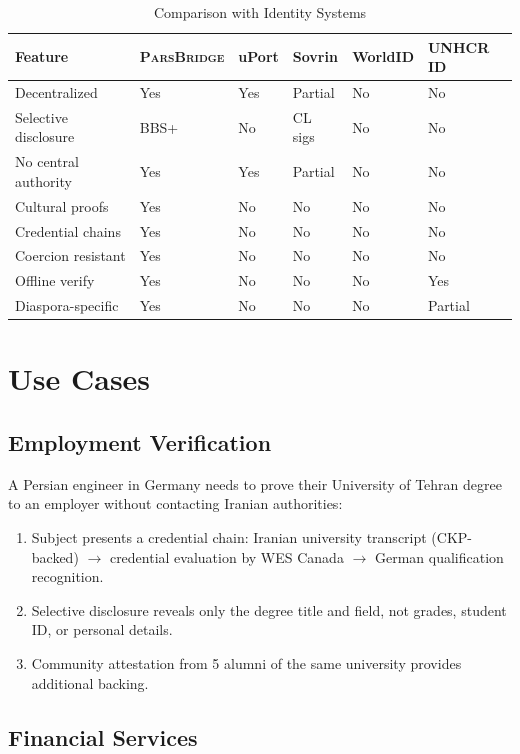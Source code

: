 \documentclass[11pt,a4paper]{article}
\newcommand{\bridge}{\textsc{ParsBridge}\xspace}
\begin{document}
\begin{table}[H]
\centering
\caption{Comparison with Identity Systems}
\label{tab:compare}
\begin{tabularx}{\textwidth}{lXXXXX}
\toprule
\textbf{Feature} & \textbf{\bridge} & \textbf{uPort} & \textbf{Sovrin} & \textbf{WorldID} & \textbf{UNHCR ID} \\
\midrule
Decentralized & Yes & Yes & Partial & No & No \\
Selective disclosure & BBS+ & No & CL sigs & No & No \\
No central authority & Yes & Yes & Partial & No & No \\
Cultural proofs & Yes & No & No & No & No \\
Credential chains & Yes & No & No & No & No \\
Coercion resistant & Yes & No & No & No & No \\
Offline verify & Yes & No & No & No & Yes \\
Diaspora-specific & Yes & No & No & No & Partial \\
\bottomrule
\end{tabularx}
\end{table}

\section{Use Cases}

\subsection{Employment Verification}

A Persian engineer in Germany needs to prove their University of Tehran degree to an employer without contacting Iranian authorities:

\begin{enumerate}
    \item Subject presents a credential chain: Iranian university transcript (CKP-backed) $\rightarrow$ credential evaluation by WES Canada $\rightarrow$ German qualification recognition.
    \item Selective disclosure reveals only the degree title and field, not grades, student ID, or personal details.
    \item Community attestation from 5 alumni of the same university provides additional backing.
\end{enumerate}

\subsection{Financial Services}
\end{document}
